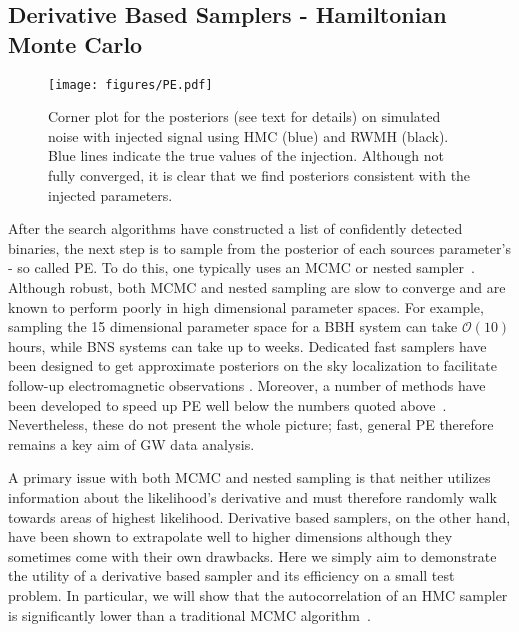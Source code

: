 \documentclass[twocolumn]{aastex631}
\begin{document}
\subsection{Derivative Based Samplers - Hamiltonian Monte Carlo}
\label{subsec:hmc}

\begin{figure*}[t]
    \centering
    \texttt{[image: figures/PE.pdf]}
    \caption{
        Corner plot for the posteriors (see text for details) on simulated noise with injected signal using HMC (blue) and RWMH (black). 
        Blue lines indicate the true values of the injection. 
        Although not fully converged, it is clear that we find posteriors consistent with the injected parameters. 
    }
    \label{fig:corner}
\end{figure*}

After the search algorithms have constructed a list of confidently detected binaries, the next step is to sample from the posterior of each sources parameter's - so called PE.
To do this, one typically uses an MCMC or nested sampler~\citep{Skilling2004, multinest, dynesty}.
Although robust, both MCMC and nested sampling are slow to converge and are known to perform poorly in high dimensional parameter spaces.
For example, sampling the 15 dimensional parameter space for a BBH system can take $\mathcal{O}(10)$ hours, while BNS systems can take up to weeks.
Dedicated fast samplers have been designed to get approximate posteriors on the sky localization to facilitate follow-up electromagnetic observations \citep[e.g.,~\texttt{BAYESTAR}][]{Singer:2015ema}. 
Moreover, a number of methods have been developed to speed up PE well below the numbers quoted above~\citep{Dax:2021tsq, Islam:2022afg,Roulet:2022kot, Zackay:2018qdy, Cornish:2021lje, Canizares:2013ywa, Leslie:2021ssu}.
Nevertheless, these do not present the whole picture; fast, general PE therefore remains a key aim of GW data analysis.

A primary issue with both MCMC and nested sampling is that neither utilizes information about the likelihood's derivative and must therefore randomly walk towards areas of highest likelihood.
Derivative based samplers, on the other hand, have been shown to extrapolate well to higher dimensions although they sometimes come with their own drawbacks.
Here we simply aim to demonstrate the utility of a derivative based sampler and its efficiency on a small test problem.
In particular, we will show that the autocorrelation of an HMC sampler is significantly lower than a traditional MCMC algorithm~\citep{Bouffanais:2018hoz, 2014CQGra..31n5004P}.
\end{document}
